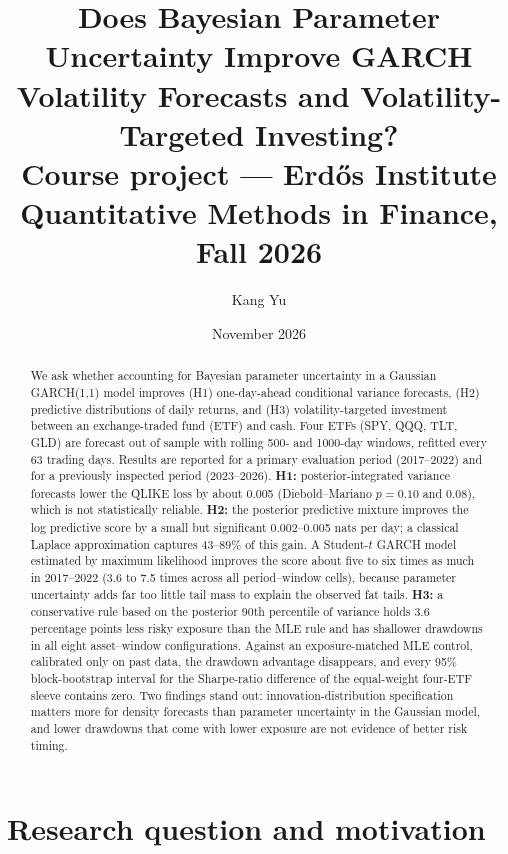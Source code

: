 \documentclass[11pt]{article}
\title{Does Bayesian Parameter Uncertainty Improve GARCH Volatility Forecasts and Volatility-Targeted Investing?\\[4pt]
\large Course project --- Erd\H{o}s Institute Quantitative Methods in Finance, Fall 2026}
\author{Kang Yu}
\date{November 2026}
\begin{document}
\maketitle

\begin{abstract}
\noindent
We ask whether accounting for Bayesian parameter uncertainty in a Gaussian GARCH(1,1) model improves (H1) one-day-ahead
conditional variance forecasts, (H2) predictive distributions of daily returns, and (H3) volatility-targeted
investment between an exchange-traded fund (ETF) and cash. Four ETFs (SPY, QQQ, TLT, GLD) are forecast out of sample
with rolling 500- and 1000-day windows, refitted every 63 trading days. Results are reported for a primary
evaluation period (2017--2022) and for a previously inspected period (2023--2026). \textbf{H1:} posterior-integrated
variance forecasts lower the QLIKE loss by about 0.005 (Diebold--Mariano $p=0.10$ and $0.08$), which is not
statistically reliable. \textbf{H2:} the posterior predictive mixture improves the log predictive score by a small
but significant 0.002--0.005 nats per day; a classical Laplace approximation captures 43--89\% of this gain. A
Student-$t$ GARCH model estimated by maximum likelihood improves the score about five to six times as much in
2017--2022 (3.6 to 7.5 times across all period--window cells), because parameter uncertainty adds far too little
tail mass to explain the observed fat tails. \textbf{H3:} a conservative rule based on the posterior 90th percentile
of variance holds 3.6 percentage points less risky exposure than the MLE rule and has shallower drawdowns in all
eight asset--window configurations. Against an exposure-matched MLE control, calibrated only on past data, the
drawdown advantage disappears, and every 95\% block-bootstrap interval for the Sharpe-ratio difference of the
equal-weight four-ETF sleeve contains zero. Two findings
stand out: innovation-distribution specification matters more for density forecasts than parameter uncertainty in
the Gaussian model, and lower drawdowns that come with lower exposure are not evidence of better risk timing.
\end{abstract}

\tableofcontents
\bigskip

\section{Research question and motivation}\label{sec:intro}
\end{document}
